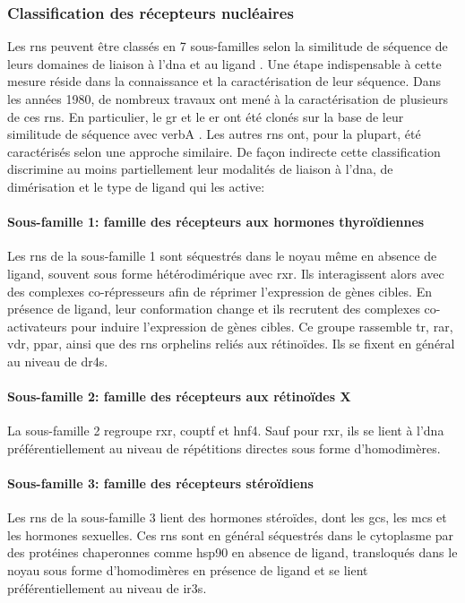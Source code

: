 \documentclass[../main.tex]{subfiles}
\begin{document}
		\subsubsection{Classification des récepteurs nucléaires}
			Les \glspl{rn} peuvent être classés en 7 sous-familles selon la similitude de séquence de leurs domaines de liaison à l'\gls{dna} et au ligand \citep{Laudet1997,Committee1999}.
			Une étape indispensable à cette mesure réside dans la connaissance et la caractérisation de leur séquence.
			Dans les années 1980, de nombreux travaux ont mené à la caractérisation de plusieurs de ces \glspl{rn}.
			En particulier, le \gls{gr} et le \gls{er} ont été clonés sur la base de leur similitude de séquence avec \gls{verbA} \citep{Hollenberg1985, Green1986}.
			Les autres \glspl{rn} ont, pour la plupart, été caractérisés selon une approche similaire.
			De façon indirecte cette classification discrimine au moins partiellement leur modalités de liaison à l'\gls{dna}, de dimérisation et le type de ligand qui les active:

			\paragraph{Sous-famille 1: famille des récepteurs aux hormones thyroïdiennes}
				Les \glspl{rn} de la sous-famille 1 sont séquestrés dans le noyau même en absence de ligand, souvent sous forme hétérodimérique avec \gls{rxr}.
				Ils interagissent alors avec des complexes co-répresseurs afin de réprimer l'expression de gènes cibles.
				En présence de ligand, leur conformation change et ils recrutent des complexes co-activateurs pour induire l'expression de gènes cibles.
				Ce groupe rassemble \gls{tr}, \gls{rar}, \gls{vdr}, \gls{ppar}, ainsi que des \glspl{rn} orphelins reliés aux rétinoïdes. Ils se fixent en général au niveau de \glspl{dr4}.

			\paragraph{Sous-famille 2: famille des récepteurs aux rétinoïdes X}
				La sous-famille 2 regroupe \gls{rxr}, \gls{couptf} et \gls{hnf4}.
				Sauf pour \gls{rxr}, ils se lient à l'\gls{dna} préférentiellement au niveau de répétitions directes sous forme d'homodimères.

			\paragraph{Sous-famille 3: famille des récepteurs stéroïdiens}
				Les \glspl{rn} de la sous-famille 3 lient des hormones stéroïdes, dont les \glspl{gc}, les \glspl{mc} et les hormones sexuelles. Ces \glspl{rn} sont en général séquestrés dans le cytoplasme par des protéines chaperonnes comme \gls{hsp90} en absence de ligand, transloqués dans le noyau sous forme d'homodimères en présence de ligand et se lient préférentiellement au niveau de \glspl{ir3}.
\end{document}
